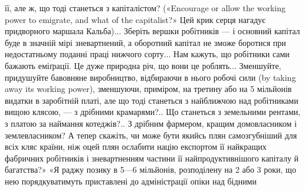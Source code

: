 її, але ж, що тоді станеться з капіталістом? («Encourage
or allow the working power to emigrate, and what of the capitalist?»
Цей крик серця нагадує придворного маршала Кальба)...
Зберіть вершки робітників — і основний капітал буде в значній
мірі зневартнений, а оборотний капітал не зможе боротися при
недостатньому поданні праці нижчого сорту... Нам кажуть,
що робітники сами бажають еміґрації. Це дуже природна річ,
що вони це роблять... Зменшуйте, придушуйте бавовняне виробництво,
відбираючи в нього робочі сили (by taking away its working
power), зменшуючи, приміром, на третину або на 5 мільйонів
видатки в заробітній платі, але що тоді станеться з найближчою
над робітниками вищою клясою, — з дрібними крамарями?..
Що станеться з земельними рентами, з платою за наймання котеджів?..
З дрібним фармером, кращим домовласником і землевласником?
А тепер скажіть, чи може бути якийсь плян самозгубніший
для всіх кляс країни, ніж оцей плян ослабити націю
експортом її найкращих фабричних робітників і зневартненням
частини її найпродуктивнішого капіталу й багатства?» «Я раджу
позику в 5—6 мільйонів, розподілену на 2 або 3 роки, що нею
порядкуватимуть приставлені до адміністрації опіки над бідними
\parbreak{}  %
